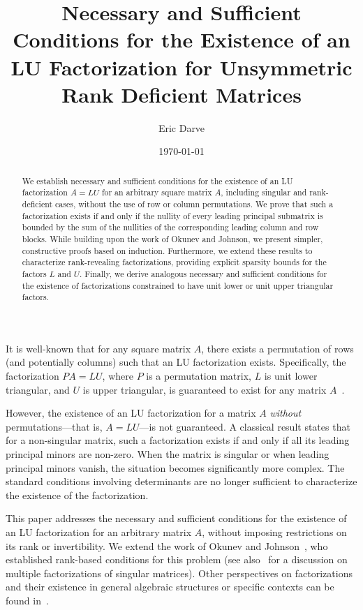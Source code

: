 \documentclass{article}
\title{Necessary and Sufficient Conditions for the Existence of an LU Factorization for Unsymmetric Rank Deficient Matrices}
\author{Eric Darve}
\date{\today}
\begin{document}
\maketitle

\begin{abstract}
    We establish necessary and sufficient conditions for the existence of an LU factorization $A=LU$ for an arbitrary square matrix $A$, including singular and rank-deficient cases, without the use of row or column permutations. We prove that such a factorization exists if and only if the nullity of every leading principal submatrix is bounded by the sum of the nullities of the corresponding leading column and row blocks. While building upon the work of Okunev and Johnson, we present simpler, constructive proofs based on induction. Furthermore, we extend these results to characterize rank-revealing factorizations, providing explicit sparsity bounds for the factors $L$ and $U$. Finally, we derive analogous necessary and sufficient conditions for the existence of factorizations constrained to have unit lower or unit upper triangular factors.
\end{abstract}


It is well-known that for any square matrix $A$, there exists a permutation of rows (and potentially columns) such that an LU factorization exists. Specifically, the factorization $PA = LU$, where $P$ is a permutation matrix, $L$ is unit lower triangular, and $U$ is upper triangular, is guaranteed to exist for any matrix $A$~\cite{higham_gaussian_2011,lu_numerical_2021}.

However, the existence of an LU factorization for a matrix $A$ \emph{without} permutations---that is, $A = LU$---is not guaranteed. A classical result states that for a non-singular matrix, such a factorization exists if and only if all its leading principal minors are non-zero. When the matrix is singular or when leading principal minors vanish, the situation becomes significantly more complex. The standard conditions involving determinants are no longer sufficient to characterize the existence of the factorization.

This paper addresses the necessary and sufficient conditions for the existence of an LU factorization for an arbitrary matrix $A$, without imposing restrictions on its rank or invertibility. We extend the work of Okunev and Johnson~\cite{okunev_necessary_2005}, who established rank-based conditions for this problem (see also~\cite{dopico_multiple_2006} for a discussion on multiple factorizations of singular matrices). Other perspectives on factorizations and their existence in general algebraic structures or specific contexts can be found in~\cite{nagarajan_products_1999,johnson_inherited_1989,jeffrey_lu_2010}.
\end{document}
